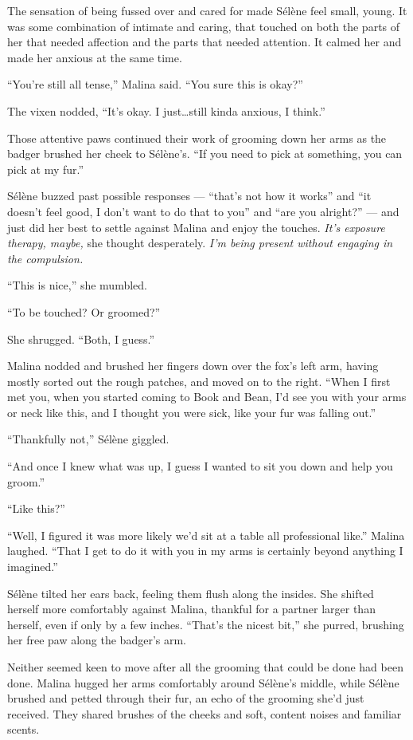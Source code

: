 The sensation of being fussed over and cared for made Sélène feel small, young. It was some combination of intimate and caring, that touched on both the parts of her that needed affection and the parts that needed attention. It calmed her and made her anxious at the same time.

``You're still all tense,'' Malina said. ``You sure this is okay?''

The vixen nodded, ``It's okay. I just\ldots{}still kinda anxious, I think.''

Those attentive paws continued their work of grooming down her arms as the badger brushed her cheek to Sélène's. ``If you need to pick at something, you can pick at my fur.''

Sélène buzzed past possible responses --- ``that's not how it works'' and ``it doesn't feel good, I don't want to do that to you'' and ``are you alright?'' --- and just did her best to settle against Malina and enjoy the touches. \emph{It's exposure therapy, maybe,} she thought desperately. \emph{I'm being present without engaging in the compulsion.}

``This is nice,'' she mumbled.

``To be touched? Or groomed?''

She shrugged. ``Both, I guess.''

Malina nodded and brushed her fingers down over the fox's left arm, having mostly sorted out the rough patches, and moved on to the right. ``When I first met you, when you started coming to Book and Bean, I'd see you with your arms or neck like this, and I thought you were sick, like your fur was falling out.''

``Thankfully not,'' Sélène giggled.

``And once I knew what was up, I guess I wanted to sit you down and help you groom.''

``Like this?''

``Well, I figured it was more likely we'd sit at a table all professional like.'' Malina laughed. ``That I get to do it with you in my arms is certainly beyond anything I imagined.''

Sélène tilted her ears back, feeling them flush along the insides. She shifted herself more comfortably against Malina, thankful for a partner larger than herself, even if only by a few inches. ``That's the nicest bit,'' she purred, brushing her free paw along the badger's arm.

Neither seemed keen to move after all the grooming that could be done had been done. Malina hugged her arms comfortably around Sélène's middle, while Sélène brushed and petted through their fur, an echo of the grooming she'd just received. They shared brushes of the cheeks and soft, content noises and familiar scents.

